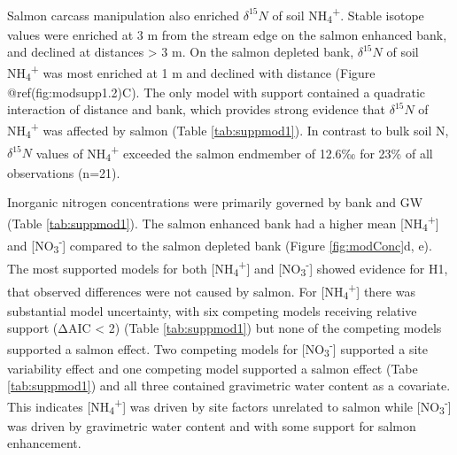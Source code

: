 \documentclass [11pt, proquest] {uwthesis}[2015/03/03]
\begin{document}
Salmon carcass manipulation also enriched \(\delta^{15}N\) of soil
NH\textsubscript{4}\textsuperscript{+}. Stable isotope values were
enriched at 3 m from the stream edge on the salmon enhanced bank, and
declined at distances \textgreater{} 3 m. On the salmon depleted bank,
\(\delta^{15}N\) of soil NH\textsubscript{4}\textsuperscript{+} was most
enriched at 1 m and declined with distance (Figure
@ref(fig:modsupp1.2)C). The only model with support contained a
quadratic interaction of distance and bank, which provides strong
evidence that \(\delta^{15}N\) of NH\textsubscript{4}\textsuperscript{+}
was affected by salmon (Table \ref{tab:suppmod1}). In contrast to bulk
soil N, \(\delta^{15}N\) values of
NH\textsubscript{4}\textsuperscript{+} exceeded the salmon endmember of
12.6‰ for 23\% of all observations (n=21).

Inorganic nitrogen concentrations were primarily governed by bank and GW
(Table \ref{tab:suppmod1}). The salmon enhanced bank had a higher mean
{[}NH\textsubscript{4}\textsuperscript{+}{]} and
{[}NO\textsubscript{3}\textsuperscript{-}{]} compared to the salmon
depleted bank (Figure \ref{fig:modConc}d, e). The most supported models
for both {[}NH\textsubscript{4}\textsuperscript{+}{]} and
{[}NO\textsubscript{3}\textsuperscript{-}{]} showed evidence for H1,
that observed differences were not caused by salmon. For
{[}NH\textsubscript{4}\textsuperscript{+}{]} there was substantial model
uncertainty, with six competing models receiving relative support (ΔAIC
\textless{} 2) (Table \ref{tab:suppmod1}) but none of the competing
models supported a salmon effect. Two competing models for
{[}NO\textsubscript{3}\textsuperscript{-}{]} supported a site
variability effect and one competing model supported a salmon effect
(Tabe \ref{tab:suppmod1}) and all three contained gravimetric water
content as a covariate. This indicates
{[}NH\textsubscript{4}\textsuperscript{+}{]} was driven by site factors
unrelated to salmon while {[}NO\textsubscript{3}\textsuperscript{-}{]}
was driven by gravimetric water content and with some support for salmon
enhancement.
\end{document}
